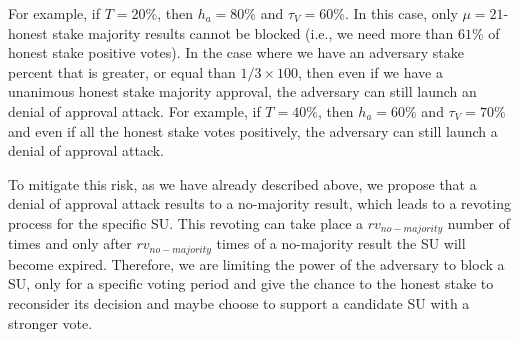%
%
For example, if $T = 20\%$, then $h_a = 80\%$ and $\tau_V = 60\%$. In this case, only $\mu = 21$-honest stake majority results cannot be blocked (i.e., we need more than $61\%$ of honest stake positive votes). In the case where we have an adversary stake percent that is greater, or equal than $1/3 \times 100$, then even if we have a unanimous honest stake majority approval, the adversary can still launch an denial of approval attack. For example, if $T = 40\%$, then $h_a = 60\%$ and $\tau_V = 70\%$ and even if all the honest stake votes positively, the adversary can still launch a denial of approval attack.

 To mitigate this risk, as we have already described above, we propose that a denial of approval attack results to a no-majority result, which leads to a revoting process for the specific SU. This revoting can take place a $rv_{no-majority}$ number of times and only after $rv_{no-majority}$ times of a no-majority result the SU will become expired. Therefore, we are limiting the power of the adversary to block a SU, only for a specific voting period and give the chance to the honest stake to reconsider its decision and maybe choose to support a candidate SU with a stronger vote.

